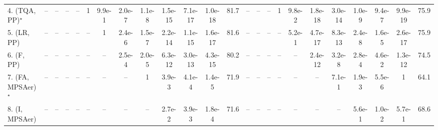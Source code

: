 \begin{table}[ht]
{\begin{tabular}{l|cccccccccccc|ccccccccccc|}
4. (TQA, PP)$^\star$ & -- & -- & -- & -- & 1 & 9.9e-1 & {\cellcolor[HTML]{00441B}} \color[HTML]{F1F1F1} 2.0e-7 & {\cellcolor[HTML]{00441B}} \color[HTML]{F1F1F1} 1.1e-8 & {\cellcolor[HTML]{00441B}} \color[HTML]{F1F1F1} 1.5e-15 & {\cellcolor[HTML]{00441B}} \color[HTML]{F1F1F1} 7.1e-17 & {\cellcolor[HTML]{00441B}} \color[HTML]{F1F1F1} 1.0e-18 & 81.7 & -- & -- & -- & 1 & 9.8e-2 & {\cellcolor[HTML]{00441B}} \color[HTML]{F1F1F1} 1.8e-18 & {\cellcolor[HTML]{00441B}} \color[HTML]{F1F1F1} 3.0e-14 & {\cellcolor[HTML]{00441B}} \color[HTML]{F1F1F1} 1.0e-9 & {\cellcolor[HTML]{00441B}} \color[HTML]{F1F1F1} 9.4e-7 & {\cellcolor[HTML]{00441B}} \color[HTML]{F1F1F1} 9.9e-19 & 75.9 \\
5. (LR, PP) & -- & -- & -- & -- & -- & 1 & {\cellcolor[HTML]{00441B}} \color[HTML]{F1F1F1} 2.4e-6 & {\cellcolor[HTML]{00441B}} \color[HTML]{F1F1F1} 1.5e-7 & {\cellcolor[HTML]{00441B}} \color[HTML]{F1F1F1} 2.2e-14 & {\cellcolor[HTML]{00441B}} \color[HTML]{F1F1F1} 1.1e-15 & {\cellcolor[HTML]{00441B}} \color[HTML]{F1F1F1} 1.6e-17 & 81.6 & -- & -- & -- & -- & 5.2e-1 & {\cellcolor[HTML]{00441B}} \color[HTML]{F1F1F1} 4.7e-17 & {\cellcolor[HTML]{00441B}} \color[HTML]{F1F1F1} 8.3e-13 & {\cellcolor[HTML]{00441B}} \color[HTML]{F1F1F1} 2.4e-8 & {\cellcolor[HTML]{00441B}} \color[HTML]{F1F1F1} 1.6e-5 & {\cellcolor[HTML]{00441B}} \color[HTML]{F1F1F1} 2.6e-17 & 75.9 \\
6. (F, PP) & -- & -- & -- & -- & -- & -- & {\cellcolor[HTML]{00441B}} \color[HTML]{F1F1F1} 2.5e-4 & {\cellcolor[HTML]{00441B}} \color[HTML]{F1F1F1} 2.0e-5 & {\cellcolor[HTML]{00441B}} \color[HTML]{F1F1F1} 6.3e-12 & {\cellcolor[HTML]{00441B}} \color[HTML]{F1F1F1} 3.0e-13 & {\cellcolor[HTML]{00441B}} \color[HTML]{F1F1F1} 4.3e-15 & 80.2 & -- & -- & -- & -- & -- & {\cellcolor[HTML]{00441B}} \color[HTML]{F1F1F1} 2.4e-12 & {\cellcolor[HTML]{00441B}} \color[HTML]{F1F1F1} 3.2e-8 & {\cellcolor[HTML]{00441B}} \color[HTML]{F1F1F1} 2.8e-4 & {\cellcolor[HTML]{B5E1AE}} \color[HTML]{000000} 4.6e-2 & {\cellcolor[HTML]{00441B}} \color[HTML]{F1F1F1} 1.3e-12 & 74.5 \\
7. (FA, MPSAer)$^\star$ & -- & -- & -- & -- & -- & -- & -- & 1 & {\cellcolor[HTML]{309950}} \color[HTML]{F1F1F1} 3.9e-3 & {\cellcolor[HTML]{00441B}} \color[HTML]{F1F1F1} 4.1e-4 & {\cellcolor[HTML]{00441B}} \color[HTML]{F1F1F1} 1.4e-5 & 71.9 & -- & -- & -- & -- & -- & -- & 7.1e-1 & {\cellcolor[HTML]{309950}} \color[HTML]{F1F1F1} 1.9e-3 & {\cellcolor[HTML]{00441B}} \color[HTML]{F1F1F1} 5.5e-6 & 1 & 64.1 \\
8. (I, MPSAer) & -- & -- & -- & -- & -- & -- & -- & -- & {\cellcolor[HTML]{B5E1AE}} \color[HTML]{000000} 2.7e-2 & {\cellcolor[HTML]{309950}} \color[HTML]{F1F1F1} 3.9e-3 & {\cellcolor[HTML]{00441B}} \color[HTML]{F1F1F1} 1.8e-4 & 71.6 & -- & -- & -- & -- & -- & -- & -- & 5.6e-1 & {\cellcolor[HTML]{B5E1AE}} \color[HTML]{000000} 1.0e-2 & 5.7e-1 & 68.6 \\

\end{tabular}}
\end{table}
